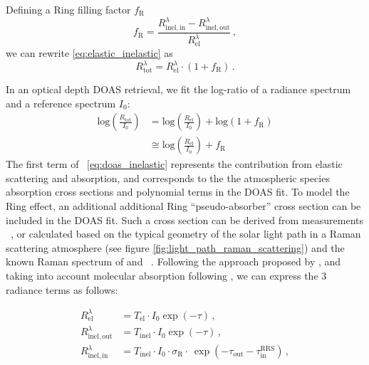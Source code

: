 Defining a Ring filling factor $f_\mathrm{R}$
\begin{equation}
  \label{eq:ring_filling_factor}
  f_\mathrm{R} = \frac{R_\mathrm{inel, in}^\lambda-R_\mathrm{inel, out}^\lambda }{R_\mathrm{el}^\lambda}\, ,
\end{equation}
we can rewrite \eqref{eq:elastic_inelastic} as
\begin{equation}
R_\mathrm{tot}^\lambda=R_\mathrm{el}^\lambda\cdot\left( 1+f_\mathrm{R}\right)\, .
\end{equation}

In an optical depth DOAS retrieval, we fit the log-ratio of a radiance spectrum and a reference spectrum $I_0$:
\begin{align}
\mathrm{log}\left( \frac{R_\mathrm{tot}}{I_0}\right) &=\mathrm{log}\left( \frac{R_\mathrm{el}}{I_0} \right) +\mathrm{log}\left( 1+f_\mathrm{R} \right) \\
 &\cong\mathrm{log}\left( \frac{R_\mathrm{el}}{I_0} \right) +f_\mathrm{R}\label{eq:doas_inelastic}
\end{align}
The first term of ~\eqref{eq:doas_inelastic} represents the
contribution from elastic scattering and absorption, and corresponds
to the the atmospheric species absorption cross sections and
polynomial terms in the DOAS fit.  To model the Ring effect, an
additional additional Ring ``pseudo-absorber'' cross section can be
included in the DOAS fit.  Such a cross section can be derived from
measurements ~\citep{Solomon_Schmeltekopf_Sanders_1987}, or calculated based on the typical geometry of the solar light path in a Raman scattering atmosphere (see figure \ref{fig:light_path_raman_scattering}) and the known Raman spectrum of \nitrogen{} and \oxygen{} ~\citep{Chance1997}.  Following the approach proposed by \citet{Wagner2009a}, and taking into account molecular absorption following \citet{Lerot2014}, we can express the 3 radiance terms as follows:

\begin{align}
  R_\mathrm{el}^\lambda &=T_\mathrm{el}\cdot I_0 \exp\left( -\tau\right) \label{eq:Rtot}
  \, ,\\
R_\mathrm{inel, out}^\lambda &=T_\mathrm{inel}\cdot I_0 \exp\left( -\tau\right) \label{eq:Rinel_out} \, ,\\
R_\mathrm{inel, in}^\lambda &=T_\mathrm{inel}\cdot I_0 \cdot\sigma_\mathrm{R}\cdot\ \exp\left( -\tau_\mathrm{out}-\tau_\mathrm{in}^\mathrm{RRS}\right) \label{eq:Rinel_in}\, ,
\end{align}

